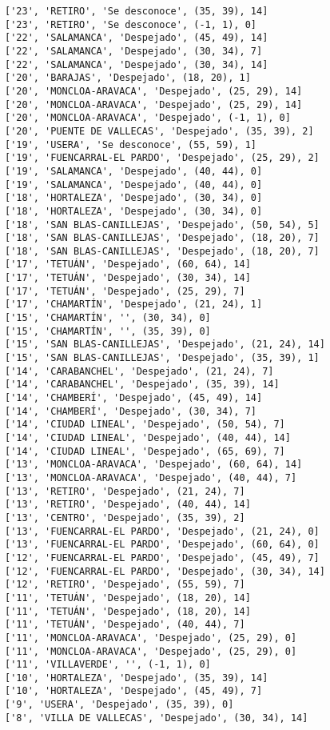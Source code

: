 \documentclass[11pt]{article}
\begin{document}
\begin{Verbatim}[commandchars=\\\{\}]
['23', 'RETIRO', 'Se desconoce', (35, 39), 14]
['23', 'RETIRO', 'Se desconoce', (-1, 1), 0]
['22', 'SALAMANCA', 'Despejado', (45, 49), 14]
['22', 'SALAMANCA', 'Despejado', (30, 34), 7]
['22', 'SALAMANCA', 'Despejado', (30, 34), 14]
['20', 'BARAJAS', 'Despejado', (18, 20), 1]
['20', 'MONCLOA-ARAVACA', 'Despejado', (25, 29), 14]
['20', 'MONCLOA-ARAVACA', 'Despejado', (25, 29), 14]
['20', 'MONCLOA-ARAVACA', 'Despejado', (-1, 1), 0]
['20', 'PUENTE DE VALLECAS', 'Despejado', (35, 39), 2]
['19', 'USERA', 'Se desconoce', (55, 59), 1]
['19', 'FUENCARRAL-EL PARDO', 'Despejado', (25, 29), 2]
['19', 'SALAMANCA', 'Despejado', (40, 44), 0]
['19', 'SALAMANCA', 'Despejado', (40, 44), 0]
['18', 'HORTALEZA', 'Despejado', (30, 34), 0]
['18', 'HORTALEZA', 'Despejado', (30, 34), 0]
['18', 'SAN BLAS-CANILLEJAS', 'Despejado', (50, 54), 5]
['18', 'SAN BLAS-CANILLEJAS', 'Despejado', (18, 20), 7]
['18', 'SAN BLAS-CANILLEJAS', 'Despejado', (18, 20), 7]
['17', 'TETUÁN', 'Despejado', (60, 64), 14]
['17', 'TETUÁN', 'Despejado', (30, 34), 14]
['17', 'TETUÁN', 'Despejado', (25, 29), 7]
['17', 'CHAMARTÍN', 'Despejado', (21, 24), 1]
['15', 'CHAMARTÍN', '', (30, 34), 0]
['15', 'CHAMARTÍN', '', (35, 39), 0]
['15', 'SAN BLAS-CANILLEJAS', 'Despejado', (21, 24), 14]
['15', 'SAN BLAS-CANILLEJAS', 'Despejado', (35, 39), 1]
['14', 'CARABANCHEL', 'Despejado', (21, 24), 7]
['14', 'CARABANCHEL', 'Despejado', (35, 39), 14]
['14', 'CHAMBERÍ', 'Despejado', (45, 49), 14]
['14', 'CHAMBERÍ', 'Despejado', (30, 34), 7]
['14', 'CIUDAD LINEAL', 'Despejado', (50, 54), 7]
['14', 'CIUDAD LINEAL', 'Despejado', (40, 44), 14]
['14', 'CIUDAD LINEAL', 'Despejado', (65, 69), 7]
['13', 'MONCLOA-ARAVACA', 'Despejado', (60, 64), 14]
['13', 'MONCLOA-ARAVACA', 'Despejado', (40, 44), 7]
['13', 'RETIRO', 'Despejado', (21, 24), 7]
['13', 'RETIRO', 'Despejado', (40, 44), 14]
['13', 'CENTRO', 'Despejado', (35, 39), 2]
['13', 'FUENCARRAL-EL PARDO', 'Despejado', (21, 24), 0]
['13', 'FUENCARRAL-EL PARDO', 'Despejado', (60, 64), 0]
['12', 'FUENCARRAL-EL PARDO', 'Despejado', (45, 49), 7]
['12', 'FUENCARRAL-EL PARDO', 'Despejado', (30, 34), 14]
['12', 'RETIRO', 'Despejado', (55, 59), 7]
['11', 'TETUÁN', 'Despejado', (18, 20), 14]
['11', 'TETUÁN', 'Despejado', (18, 20), 14]
['11', 'TETUÁN', 'Despejado', (40, 44), 7]
['11', 'MONCLOA-ARAVACA', 'Despejado', (25, 29), 0]
['11', 'MONCLOA-ARAVACA', 'Despejado', (25, 29), 0]
['11', 'VILLAVERDE', '', (-1, 1), 0]
['10', 'HORTALEZA', 'Despejado', (35, 39), 14]
['10', 'HORTALEZA', 'Despejado', (45, 49), 7]
['9', 'USERA', 'Despejado', (35, 39), 0]
['8', 'VILLA DE VALLECAS', 'Despejado', (30, 34), 14]

\end{Verbatim}
\end{document}
